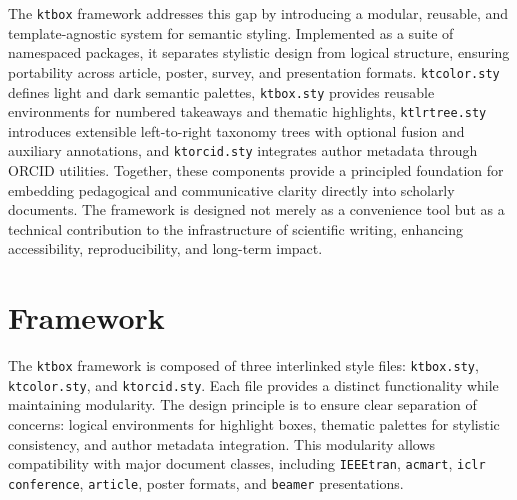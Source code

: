 \documentclass[12pt,onecolumn]{article}
\begin{document}
The \texttt{ktbox} framework addresses this gap by introducing a modular, reusable, and template-agnostic system for semantic styling. Implemented as a suite of namespaced packages, it separates stylistic design from logical structure, ensuring portability across article, poster, survey, and presentation formats. \texttt{ktcolor.sty} defines light and dark semantic palettes, \texttt{ktbox.sty} provides reusable environments for numbered takeaways and thematic highlights, \texttt{ktlrtree.sty} introduces extensible left-to-right taxonomy trees with optional fusion and auxiliary annotations, and \texttt{ktorcid.sty} integrates author metadata through ORCID utilities. Together, these components provide a principled foundation for embedding pedagogical and communicative clarity directly into scholarly documents. The framework is designed not merely as a convenience tool but as a technical contribution to the infrastructure of scientific writing, enhancing accessibility, reproducibility, and long-term impact.


  \section{Framework}
  \label{sec:framework}
The \texttt{ktbox} framework is composed of three interlinked style files: \texttt{ktbox.sty}, \texttt{ktcolor.sty}, and \texttt{ktorcid.sty}. Each file provides a distinct functionality while maintaining modularity. The design principle is to ensure clear separation of concerns: logical environments for highlight boxes, thematic palettes for stylistic consistency, and author metadata integration. This modularity allows compatibility with major document classes, including \texttt{IEEEtran}, \texttt{acmart}, \texttt{iclr conference}, \texttt{article}, poster formats, and \texttt{beamer} presentations.
\end{document}
